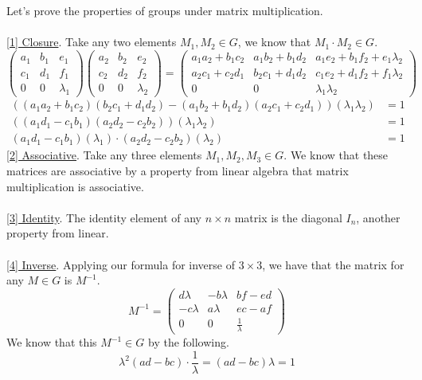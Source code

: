 Let's prove the properties of groups under matrix multiplication.\\
\\
\underline{[1] Closure}. Take any two elements $M_1,M_2 \in G$, we know that $M_1 \cdot M_2 \in G$.
$$
\begin{pmatrix}
    a_1 & b_1 & e_1\\
    c_1 & d_1 & f_1\\
    0 & 0 & \lambda_1
\end{pmatrix}
\begin{pmatrix}
    a_2 & b_2 & e_2\\
    c_2 & d_2 & f_2\\
    0 & 0 & \lambda_2
\end{pmatrix} = \begin{pmatrix}
    a_1a_2 + b_1c_2 & a_1b_2 + b_1d_2 & a_1e_2 + b_1f_2 + e_1\lambda_2\\
    a_2c_1 + c_2d_1 & b_2c_1+ d_1d_2 & c_1e_2 + d_1f_2 + f_1\lambda_2 \\
    0 & 0 & \lambda_1 \lambda_2
\end{pmatrix}
$$
\begin{align*}
((a_1a_2 + b_1c_2)(b_2c_1+ d_1d_2) - (a_1b_2 + b_1d_2)(a_2c_1 + c_2d_1))(\lambda_1 \lambda_2) &= 1\\
((a_1d_1 - c_1b_1)(a_2d_2-c_2b_2))(\lambda_1 \lambda_2) &= 1\\
(a_1d_1 - c_1b_1)(\lambda_1)\cdot (a_2d_2-c_2b_2)(\lambda_2) &= 1
\end{align*}
\underline{[2] Associative}. Take any three elements $M_1,M_2,M_3 \in G$. We know that these matrices are associative by a property from linear algebra that matrix multiplication is associative.\\
\\
\underline{[3] Identity}. The identity element of any $n \times n$ matrix is the diagonal $I_n$, another property from linear.\\
\\
\underline{[4] Inverse}. Applying our formula for inverse of $3 \times 3$, we have that the matrix for any $M \in G$ is $M^{-1}$.
$$
M^{-1} = \begin{pmatrix}
    d\lambda & -b\lambda & bf-ed\\
    -c\lambda & a\lambda & ec - af\\
    0 & 0 & \frac{1}{\lambda}
\end{pmatrix}
$$
We know that this $M^{-1} \in G$ by the following.
$$
\lambda^2(ad - bc)\cdot \frac{1}{\lambda} = (ad - bc)\lambda = 1
$$


